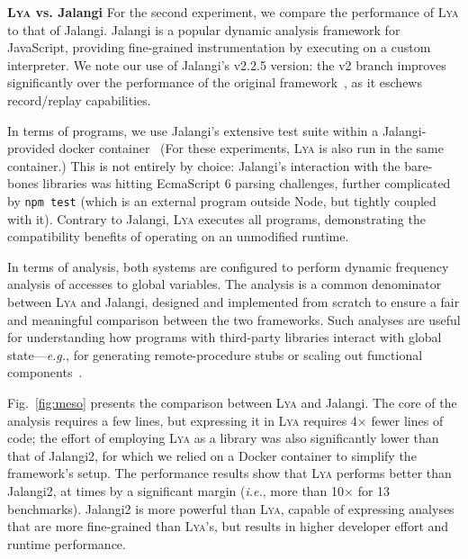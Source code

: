 \documentclass[letterpaper,twocolumn,10pt]{article}
\def\eg{{\em e.g.}, }
\def\ie{{\em i.e.}, }
\newcommand{\heading}[1]{\vspace{2pt}\noindent\textbf{#1}\enspace}
\newcommand{\ttt}[1]{\texttt{#1}}
\newcommand{\sys}{{\scshape Lya}\xspace}
\begin{document}
\heading{\sys vs. Jalangi}
For the second experiment, we compare the performance of \sys to that of Jalangi.
Jalangi is a popular dynamic analysis framework for JavaScript, providing fine-grained instrumentation by executing on a custom interpreter.
We note our use of Jalangi's v2.2.5 version:
  the v2 branch improves significantly over the performance of the original framework~\cite{jalangi}, as it eschews record/replay capabilities.

In terms of programs, we use Jalangi's extensive test suite within a Jalangi-provided docker container~\cite{jaladocker}
(For these experiments, \sys is also run in the same container.)
This is not entirely by choice:
  Jalangi's interaction with the bare-bones libraries was hitting EcmaScript 6 parsing challenges, further complicated by \ttt{npm test} (which is an external program outside Node, but tightly coupled with it).
Contrary to Jalangi, \sys executes all programs, demonstrating the compatibility benefits of operating on an unmodified runtime.


In terms of analysis, both systems are configured to perform dynamic frequency analysis of accesses to global variables.
The analysis is a common denominator between \sys and Jalangi, designed and implemented from scratch to ensure a fair and meaningful comparison between the two frameworks.
Such analyses are useful for understanding how programs with third-party libraries interact with global state---\eg for generating remote-procedure stubs or scaling out functional components~\cite{ignis}.

Fig.~\ref{fig:meso} presents the comparison between \sys and Jalangi.
The core of the analysis requires a few lines, but expressing it in \sys requires 4$\times$ fewer lines of code;
  the effort of employing \sys as a library was also significantly lower than that of Jalangi2, for which we relied on a Docker container to simplify the framework's setup.
The performance results show that \sys performs better than Jalangi2, at times by a significant margin (\ie more than 10$\times$ for 13 benchmarks).
Jalangi2 is more powerful than \sys, capable of expressing analyses that are more fine-grained than \sys's, but results in higher developer effort and runtime performance.
\end{document}
